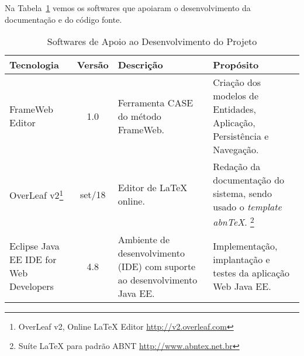 
\newpage
Na Tabela~\ref{tabela-software} vemos os softwares que apoiaram o desenvolvimento da documentação e do código fonte.

\begin{table}[h]
	\centering	
	\vspace{0.5cm}
	\caption{Softwares de Apoio ao Desenvolvimento do Projeto}	
	\label{tabela-software}
	\begin{minipage}{\textwidth}
    	\begin{tabular}{|p{3cm}|c|p{4.5cm}|p{5.5cm}|}  \hline 
    	
     		Tecnologia &
     		Versão &
     		Descrição & 
     		Propósito 
     		\\\hline 
     		 
    		FrameWeb Editor &
    		1.0 &
    		Ferramenta CASE do método FrameWeb. &
    		Criação dos modelos de Entidades, Aplicação, Persistência e Navegação.
    		\\\hline
    
    		OverLeaf v2\footnote{OverLeaf v2, Online LaTeX Editor \url{http://v2.overleaf.com}} &
    		set/18 &
    		Editor de \LaTeX{} online. &
    		Redação da documentação do sistema, sendo usado o \textit{template} \textit{abnTeX}.
    		    \footnote{Suíte LaTeX para padrão ABNT \url{http://www.abntex.net.br}} 
		    \\\hline    
    
    		Eclipse Java EE IDE for Web Developers &
    		4.8 &
    		Ambiente de desenvolvimento (IDE) com suporte ao desenvolvimento Java EE. &
    		Implementação, implantação e testes da aplicação Web Java EE. 
    		\\\hline 
    		
    	\end{tabular}
	\end{minipage}
\end{table}

